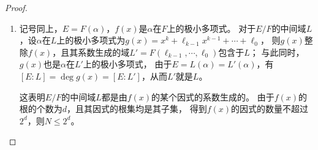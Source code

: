 \begin{enumerate}
\begin{proof}
\begin{enumerate}[label=(\arabic*)]
    设$K$是$f(x)$在$F$上的分裂域，$G=\operatorname{Gal}(K/F)$，
    有$|G|=[K:F] \leqslant d!$，则$G$的子集至多有$2^{d!}$个。
    $E/F$的中间域的数量小于等于$K/F$的中间域的数量，
    由Galois扩张对应定理，这就是$G$的子群的数量，
    $G$的子群当然是其子集，从而$N\leqslant2^{d!}$。
    \item 记号同上，$E=F(\alpha)$，$f(x)$是$\alpha$在$F$上的极小多项式。
    对于$E/F$的中间域$L$，设$\alpha$在$L$上的极小多项式为$g(x)=x^k+\ell_{k-1}x^{k-1}+\cdots+\ell_0$，
    则$g(x)$整除$f(x)$，且其系数生成的域$L'=F(\ell_{k-1},\cdots,\ell_0)$包含于$L$；
    与此同时，$g(x)$也是$\alpha$在$L'$上的极小多项式，
    由于$E=L(\alpha)=L'(\alpha)$，有$[E:L]=\deg g(x)=[E:L']$，从而$L'$就是$L$。
    
    这表明$E/F$的中间域$L$都是由$f(x)$的某个因式的系数生成的。
    由于$f(x)$的根的个数为$d$，且其因式的根集均是其子集，
    得到$f(x)$的因式的数量不超过$2^d$，则$N\leqslant2^d$。
    

\end{enumerate}
\end{proof}
\end{enumerate}
